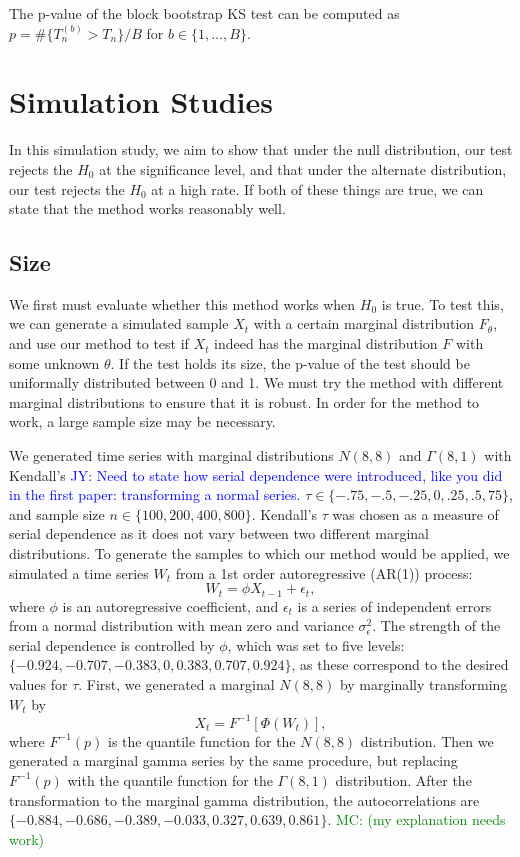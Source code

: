 \documentclass[12pt, titlepage, letterpaper]{article}
\newcommand{\jy}[1]{\textcolor{blue}{JY: #1}}
\newcommand{\mc}[1]{\textcolor{green}{MC: (#1)}}
\begin{document}
{The p-value of the block bootstrap KS test can be computed
as $p = \#\{T^{(b)}_n > T_n\} / B$ for 
$b \in \{1, \ldots, B\}$.

\section{Simulation Studies}
\label{sec:simu}

In this simulation study, we aim to show that under the null
distribution, our test rejects the $H_0$ at the significance level, 
and that under the alternate distribution, our test rejects the $H_0$ at a high
rate. If
both of these things are true, we can state that the method works
reasonably well.


\subsection{Size}
We first must evaluate whether this method works when $H_0$ is true. To
test this, we can
generate a simulated sample $X_t$ with a certain marginal distribution 
$F_\theta$,
and use our method to test if $X_t$ indeed has the marginal distribution $F$ 
with some unknown $\theta$. If the test holds its size, the 
p-value
of the test should be uniformally distributed between 0 and 1. We must try the
method with different marginal distributions to ensure that it is robust.
In order for the method to work, a large sample size may be necessary. 


We generated time series with marginal distributions $N(8, 8)$ and
$\Gamma(8, 1)$ with Kendall's
\jy{Need to state how serial dependence were introduced, like you did in the
  first paper: transforming a normal series.}
$\tau \in \{-.75, -.5, -.25, 0, .25, .5, 75\}$, and
sample size $n \in \{100, 200, 400, 800\}$. Kendall's $\tau$ was chosen as a
measure of serial dependence as it does not vary between two different 
marginal distributions.
To generate the samples to which our
method would be applied, we simulated a time series $W_t$ from a 1st 
order autoregressive (AR(1)) process:
\begin{equation*}
W_t = \phi X_{t-1} + \epsilon_t,
\end{equation*}
where $\phi$ is an autoregressive coefficient, and $\epsilon_t$ is a series of
independent errors from a normal distribution with mean zero and variance
$\sigma_{\epsilon}^2$. The strength of the serial dependence is controlled by
$\phi$, which was set to five levels: 
$\{-0.924, -0.707, -0.383, 0, 0.383, 0.707, 0.924\}$, as these
correspond to the desired values for $\tau$. First, we generated a
marginal $N(8, 8)$ by marginally transforming $W_t$ by
\begin{equation*}
X_t = F^{-1}[\Phi(W_t)],
\end{equation*}
where $F^{-1}(p)$ is the quantile function for the $N(8, 8)$ 
distribution.
Then we generated a marginal gamma series by the same procedure, but
replacing $F^{-1}(p)$ with the quantile function for the $\Gamma(8, 1)$
distribution.
After the transformation
to the marginal gamma distribution, the autocorrelations are $\{-0.884, 
-0.686, -0.389, -0.033, 0.327, 0.639, 0.861\}$.
\mc{my explanation needs work}


}
\end{document}
